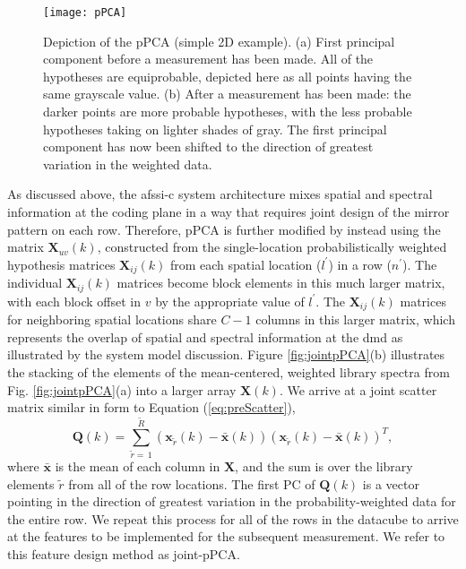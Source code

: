 %
%
\begin{figure}[htb]
  \centering
  \texttt{[image: pPCA]}
  \caption{Depiction of the pPCA (simple 2D example). (a) First principal component before a measurement has been made. All of the hypotheses are equiprobable, depicted here as all points having the same grayscale value. (b) After a measurement has been made: the darker points are more probable hypotheses, with the less probable hypotheses taking on lighter shades of gray. The first principal component has now been shifted to the direction of greatest variation in the weighted data.}\label{fig:pPCA}
\end{figure}
%
%

As discussed above, the \gls{afssi-c} system architecture mixes spatial and spectral information at the coding plane in a way that requires joint design of the mirror pattern on each row. Therefore, pPCA is further modified by instead using the matrix $\textbf{\~X}_{u v}(k)$, constructed from the single-location probabilistically weighted hypothesis matrices $\textbf{X}_{ij}(k)$ from each spatial location ($l^\prime$) in a row ($n^\prime$). The individual $\textbf{X}_{i j}(k)$ matrices become block elements in this much larger matrix, with each block offset in $v$ by the appropriate value of $l^\prime$. The $\textbf{X}_{ij}(k)$ matrices for neighboring spatial locations share $C-1$ columns in this larger matrix, which represents the overlap of spatial and spectral information at the \gls{dmd} as illustrated by the system model discussion. Figure \ref{fig:jointpPCA}(b) illustrates the stacking of the elements of the mean-centered, weighted library spectra from Fig. \ref{fig:jointpPCA}(a) into a larger array $\textbf{\~X}(k)$. We arrive at a joint scatter matrix similar in form to Equation (\ref{eq:preScatter}),
%
%
\begin{equation}
	\textbf{\~{Q}}(k) = \sum^{\tilde{R}}_{\tilde{r}=\,1} \left(\textbf{\~x}_{\tilde{r}}(k) - \bar{\textbf{\~x}}(k)\right) \left(\textbf{\~x}_{\tilde{r}}(k) - \bar{\textbf{\~x}}(k)\right)^T,
\end{equation}
%
%
where $\bar{\textbf{\~x}}$ is the mean of each column in $\textbf{\~X}$, and the sum is over the library elements $\tilde{r}$ from all of the row locations. The first PC of $\textbf{\~Q}(k)$ is a vector pointing in the direction of greatest variation in the probability-weighted data for the entire row. We repeat this process for all of the rows in the datacube to arrive at the features to be implemented for the subsequent measurement. We refer to this feature design method as joint-pPCA.

